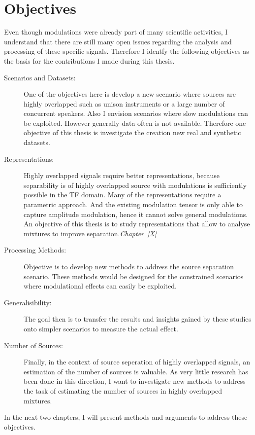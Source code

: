 \section{Objectives}

Even though modulations were already part of many scientific activities, I understand that there are still many open issues regarding the analysis and processing of these specific signals.
Therefore I identfy the following objectives as the basis for the contributions I made during this thesis.
\begin{description}
  \item[Scenarios and Datasets:] One of the objectives here is develop a new scenario where sources are highly overlapped such   as unison instruments or a large number of concurrent speakers. Also I envision scenarios where slow modulations can be      exploited. However generally data often is not available. Therefore one objective of this thesis is investigate the          creation new real and synthetic datasets.
  \item[Representations:] Highly overlapped signals require better representations, because separability is of highly overlapped source with modulations is sufficiently possible in the TF domain.
    Many of the representations require a parametric approach. And the existing modulation tensor is only able to capture amplitude modulation, hence it cannot solve general modulations.
    An objective of this thesis is to study representations that allow to analyse mixtures to improve separation.\emph{Chapter~\ref{X}}
  \item[Processing Methods:] Objective is to develop new methods to address the source separation scenario. These methods would be designed for the constrained scenarios where modulational effects can easily be exploited.
  \item[Generalisibility:] The goal then is to transfer the results and insights gained by these
    studies onto simpler scenarios to measure the actual effect.
  \item[Number of Sources:] Finally, in the context of source seperation of highly overlapped signals, an estimation of the number of sources is valuable. As very little research has been done in this direction, I want to investigate new methods to address the task of estimating the number of sources in highly overlapped mixtures.
\end{description}

In the next two chapters, I will present methods and arguments to address these objectives.
